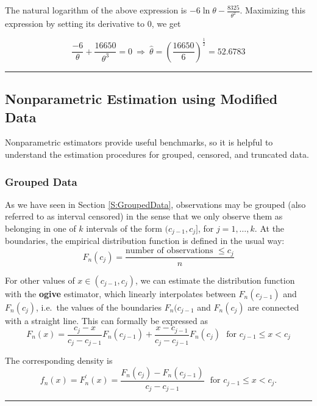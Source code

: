 \documentclass[]{book}
\theoremstyle{definition}
\theoremstyle{definition}
\theoremstyle{definition}
\theoremstyle{remark}
\begin{document}
The natural logarithm of the above expression is
\(-6\ln\theta - \frac{8325}{\theta^2}\). Maximizing this expression by
setting its derivative to 0, we get

\[\frac{-6}{\theta} + \frac{16650}{\theta^3} = 0 \ \Rightarrow \ \hat{\theta} = \left(\frac{16650}{6}\right)^{\frac{1}{2}} = 52.6783\]

\begin{center}\rule{0.5\linewidth}{\linethickness}\end{center}

\subsection{Nonparametric Estimation using Modified
Data}\label{nonparametric-estimation-using-modified-data}

Nonparametric estimators provide useful benchmarks, so it is helpful to
understand the estimation procedures for grouped, censored, and
truncated data.

\subsubsection{Grouped Data}\label{grouped-data}

As we have seen in Section \ref{S:GroupedData}, observations may be
grouped (also referred to as interval censored) in the sense that we
only observe them as belonging in one of \(k\) intervals of the form
\((c_{j-1}, c_j]\), for \(j=1, \ldots, k\). At the boundaries, the
empirical distribution function is defined in the usual way:
\[F_n(c_j) = \frac{\text{number of observations } \le c_j}{n}\]

For other values of \(x \in (c_{j-1}, c_j)\), we can estimate the
distribution function with the \textbf{ogive} estimator, which linearly
interpolates between \(F_n(c_{j-1})\) and \(F_n(c_j)\), i.e.~the values
of the boundaries \(F_n(c_{j-1}\) and \(F_n(c_j)\) are connected with a
straight line. This can formally be expressed as
\[F_n(x) = \frac{c_j-x}{c_j-c_{j-1}} F_n(c_{j-1}) + \frac{x-c_{j-1}}{c_j-c_{j-1}} F_n(c_j) \ \ \ \text{for } c_{j-1} \le x < c_j\]

The corresponding density is
\[f_n(x) = F^{\prime}_n(x) = \frac{F_n(c_j)-F_n(c_{j-1})}{c_j - c_{j-1}} \ \ \  \text{for } c_{j-1} \le x < c_j .\]

\begin{center}\rule{0.5\linewidth}{\linethickness}\end{center}
\end{document}
